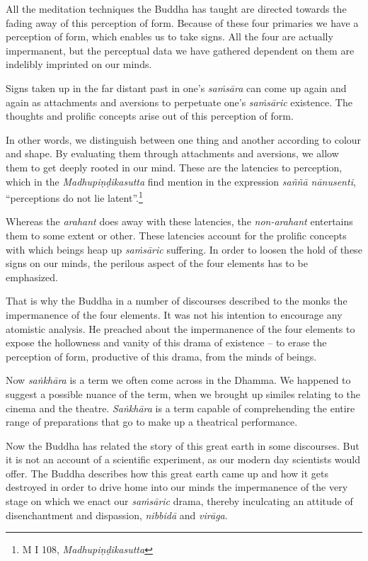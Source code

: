 All the meditation techniques the Buddha has taught are directed towards the fading away of this perception of form. Because of these four primaries we have a perception of form, which enables us to take signs. All the four are actually impermanent, but the perceptual data we have gathered dependent on them are indelibly imprinted on our minds.

Signs taken up in the far distant past in one's \emph{saṁsāra} can come up again and again as attachments and aversions to perpetuate one's \emph{saṁsāric} existence. The thoughts and prolific concepts arise out of this perception of form.

In other words, we distinguish between one thing and another according to colour and shape. By evaluating them through attachments and aversions, we allow them to get deeply rooted in our mind. These are the latencies to perception, which in the \emph{Madhupiṇḍikasutta} find mention in the expression \emph{saññā nānusenti}, ``perceptions do not lie latent''.\footnote{M I 108, \emph{Madhupiṇḍikasutta}}

Whereas the \emph{arahant} does away with these latencies, the \emph{non-arahant} entertains them to some extent or other. These latencies account for the prolific concepts with which beings heap up \emph{saṁsāric} suffering. In order to loosen the hold of these signs on our minds, the perilous aspect of the four elements has to be emphasized.

\clearpage

That is why the Buddha in a number of discourses described to the monks the impermanence of the four elements. It was not his intention to encourage any atomistic analysis. He preached about the impermanence of the four elements to expose the hollowness and vanity of this drama of existence -- to erase the perception of form, productive of this drama, from the minds of beings.

Now \emph{saṅkhāra} is a term we often come across in the Dhamma. We happened to suggest a possible nuance of the term, when we brought up similes relating to the cinema and the theatre. \emph{Saṅkhāra} is a term capable of comprehending the entire range of preparations that go to make up a theatrical performance.

Now the Buddha has related the story of this great earth in some discourses. But it is not an account of a scientific experiment, as our modern day scientists would offer. The Buddha describes how this great earth came up and how it gets destroyed in order to drive home into our minds the impermanence of the very stage on which we enact our \emph{saṁsāric} drama, thereby inculcating an attitude of disenchantment and dispassion, \emph{nibbidā} and \emph{virāga}.

